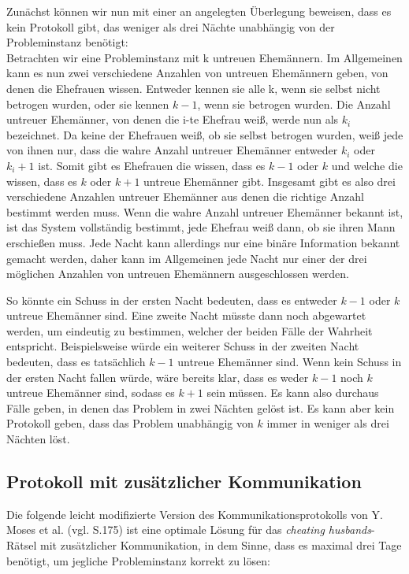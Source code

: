 Zunächst können wir nun mit einer an \cite{moses1986cheating} angelegten Überlegung beweisen, dass es kein Protokoll gibt, das weniger als drei Nächte unabhängig von der Probleminstanz benötigt:\\

Betrachten wir eine Probleminstanz mit k untreuen Ehemännern.
Im Allgemeinen kann es nun zwei verschiedene Anzahlen von untreuen Ehemännern geben, von denen die Ehefrauen wissen.
Entweder kennen sie alle k, wenn sie selbst nicht betrogen wurden, oder sie kennen $k-1$, wenn sie betrogen wurden.
Die Anzahl untreuer Ehemänner, von denen die i-te Ehefrau weiß, werde nun als $k_i$ bezeichnet.
Da keine der Ehefrauen weiß, ob sie selbst betrogen wurden, weiß jede von ihnen nur, dass die wahre Anzahl untreuer Ehemänner entweder $k_i$ oder $k_i+1$ ist.
Somit gibt es Ehefrauen die wissen, dass es $k-1$ oder $k$ und welche die wissen, dass es $k$ oder $k+1$ untreue Ehemänner gibt.
Insgesamt gibt es also drei verschiedene Anzahlen untreuer Ehemänner aus denen die richtige Anzahl bestimmt werden muss.
Wenn die wahre Anzahl untreuer Ehemänner bekannt ist, ist das System vollständig bestimmt, jede Ehefrau weiß dann, ob sie ihren Mann erschießen muss.
Jede Nacht kann allerdings nur eine binäre Information bekannt gemacht werden, daher kann im Allgemeinen jede Nacht nur einer der drei möglichen Anzahlen von untreuen Ehemännern ausgeschlossen werden.

So könnte ein Schuss in der ersten Nacht bedeuten, dass es entweder $k-1$ oder $k$ untreue Ehemänner sind.
Eine zweite Nacht müsste dann noch abgewartet werden, um eindeutig zu bestimmen, welcher der beiden Fälle der Wahrheit entspricht.
Beispielsweise würde ein weiterer Schuss in der zweiten Nacht bedeuten, dass es tatsächlich $k-1$ untreue Ehemänner sind.
Wenn kein Schuss in der ersten Nacht fallen würde, wäre bereits klar, dass es weder $k-1$ noch $k$ untreue Ehemänner sind, sodass es $k+1$ sein müssen. Es kann also durchaus Fälle geben, in denen das Problem in zwei Nächten gelöst ist. Es kann aber kein Protokoll geben, dass das Problem unabhängig von $k$ immer in weniger als drei Nächten löst.\\

\subsection{Protokoll mit zusätzlicher Kommunikation}

Die folgende leicht modifizierte Version des Kommunikationsprotokolls von Y. Moses et al. \cite{moses1986cheating} (vgl. S.175) ist eine optimale Lösung für das \textit{cheating husbands}-Rätsel mit zusätzlicher Kommunikation, in dem Sinne, dass es maximal drei Tage benötigt, um jegliche Probleminstanz korrekt zu lösen:

